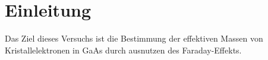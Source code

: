 \section{Einleitung}
Das Ziel dieses Versuchs ist die Bestimmung der effektiven Massen von Kristallelektronen in GaAs durch ausnutzen des Faraday-Effekts. 
